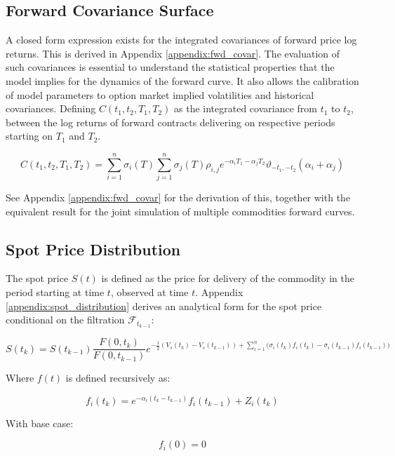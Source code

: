 \documentclass{article}
\begin{document}
\subsection{Forward Covariance Surface}
A closed form expression exists for the integrated covariances of
forward price log returns. This is derived in Appendix \ref{appendix:fwd_covar}. The evaluation of such 
covariances is essential to
understand the statistical properties that the model implies for the dynamics of 
the forward curve. It also allows the calibration of model parameters to option
market implied volatilities and historical covariances. 
Defining $C(t_1, t_2, T_1, T_2)$
as the integrated covariance from $t_1$ to $t_2$, between the log returns of forward 
contracts delivering on respective periods starting on $T_1$ and $T_2$.

\begin{equation}
    C(t_1, t_2, T_1, T_2) = \sum_{i=1}^n \sigma_i(T) \sum_{j=1}^n \sigma_j(T) \rho_{i,j} 
    e^{-\alpha_i T_1 -\alpha_j T_2} \vartheta_{-t_1, -t_2}(\alpha_i + \alpha_j)
\end{equation}

See Appendix \ref{appendix:fwd_covar} for the derivation of this, together with
the equivalent result for the joint simulation of multiple commodities forward curves.

\subsection{Spot Price Distribution}
The spot price $S(t)$ is defined as the price for delivery of the commodity in the period
starting at time $t$, observed at time $t$. Appendix \ref{appendix:spot_distribution}
derives an analytical form for the spot price conditional on the  filtration 
$\mathcal{F}_{t_{k-1}}$:

\begin{equation}
    S(t_k) = S(t_{k-1}) \frac{F(0, t_k)}{F(0, t_{k-1})} e^{- \frac{1}{2} (V_s(t_k) - 
    V_s(t_{k-1})) + \sum_{i=1}^n \bigl(\sigma_i(t_k)f_i(t_k) - \sigma_i(t_{k-1})f_i(t_{k-1})\bigr)}
\end{equation}

Where $f(t)$ is defined recursively as:

\begin{equation}
    f_i(t_k) = e^{-\alpha_i(t_k - t_{k-1})}f_i(t_{k-1}) + Z_i(t_k)
\end{equation}

With base case:

\begin{equation}
    f_i(0) = 0
\end{equation}
\end{document}
